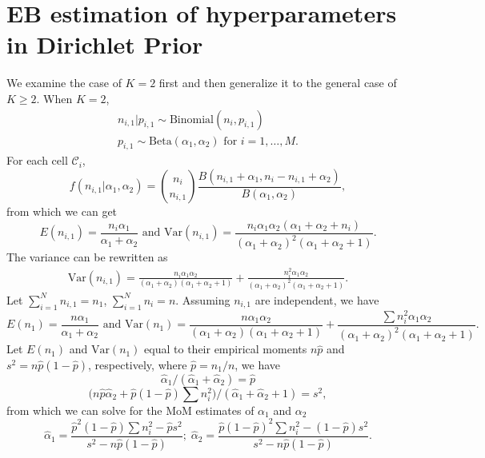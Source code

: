 \documentclass[10pt,journal,compsoc]{IEEEtran}
\newcommand{\C}{\mathcal{C}}
\begin{document}
\section{\large  EB estimation of hyperparameters in Dirichlet Prior} \label{MoM.proof}\vspace{-3pt}
We examine the case of $K=2$ first and then generalize it to the general case of $K\ge2$. When $K=2$,
\begin{align*}
n_{i,1}|p_{i,1}\sim\mbox{Binomial}(n_i,p_{i,1})\\
p_{i,1}\sim\mbox{Beta}(\alpha_1,\alpha_2)\mbox{ for }i=1,\dots,M.
\end{align*}
For each cell $\C_i$, 
$$f(n_{i,1}|\alpha_1,\alpha_2)=\binom{n_i}{n_{i,1}}\frac{B(n_{i,1}+\alpha_1,n_i-n_{i,1}+\alpha_2)}{B(\alpha_1,\alpha_2)},$$
from which we can get
$$E(n_{i,1})=\frac{n_i\alpha_1}{\alpha_1+\alpha_2}\mbox{ and }\mbox{Var}(n_{i,1})=\frac{n_i\alpha_1\alpha_2(\alpha_1+\alpha_2+n_i)}{(\alpha_1+\alpha_2)^2(\alpha_1+\alpha_2+1)}.$$
The variance can be rewritten as 
\begin{align*}
\mbox{Var}(n_{i,1})
=\frac{n_i\alpha_1\alpha_2}{(\alpha_1+\alpha_2)(\alpha_1+\alpha_2+1)}\!+\!\frac{n_i^2\alpha_1\alpha_2}{(\alpha_1+\alpha_2)^2(\alpha_1+\alpha_2+1)}.
\end{align*}
Let $\sum_{i=1}^N n_{i,1}=n_1$, $\sum_{i=1}^N n_i=n$. Assuming $n_{i,1}$ are independent, we have
$$E(n_1)=\frac{n\alpha_1}{\alpha_1+\alpha_2}\mbox{ and }\mbox{Var}(n_1)=\frac{n\alpha_1\alpha_2}{(\alpha_1+\alpha_2)(\alpha_1+\alpha_2+1)}\!+\!\frac{\sum n_i^2\alpha_1\alpha_2}{(\alpha_1+\alpha_2)^2(\alpha_1+\alpha_2+1)}.$$
Let $E(n_1)$ and $\mbox{Var}(n_1)$ equal to their empirical moments $n\hat{p}$ and $s^2=n\hat{p}(1-\hat{p})$, respectively,  where $\hat{p}=n_1/n$, we have
$$\hat{\alpha}_1/(\hat{\alpha}_1+\hat{\alpha}_2)= \hat{p}$$
$$\big(n\hat{p}\hat{\alpha}_2+\hat{p}(1-\hat{p})\sum n_i^2\big)/(\hat{\alpha}_1+\hat{\alpha}_2+1)=s^2,$$
from which we can solve for the MoM estimates of $\alpha_1$ and $\alpha_2$
$$\hat{\alpha}_1=\frac{\hat{p}^2(1-\hat{p})\sum n_i^2-\hat{p}s^2}{s^2-n\hat{p}(1-\hat{p})};\;\hat{\alpha}_2=\frac{\hat{p}(1-\hat{p})^2\sum n_i^2-(1-\hat{p})s^2}{s^2-n\hat{p}(1-\hat{p})}.$$
\end{document}
